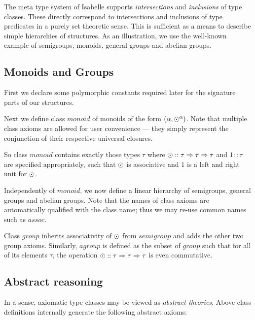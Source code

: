 


The meta type system of Isabelle supports \emph{intersections} and
\emph{inclusions} of type classes. These directly correspond to intersections
and inclusions of type predicates in a purely set theoretic sense. This is
sufficient as a means to describe simple hierarchies of structures.  As an
illustration, we use the well-known example of semigroups, monoids, general
groups and abelian groups.


\subsection{Monoids and Groups}

First we declare some polymorphic constants required later for the signature
parts of our structures.


Next we define class $monoid$ of monoids of the form $(\alpha,
{\odot}^\alpha)$.  Note that multiple class axioms are allowed for user
convenience --- they simply represent the conjunction of their respective
universal closures.


So class $monoid$ contains exactly those types $\tau$ where $\odot :: \tau
\Rightarrow \tau \Rightarrow \tau$ and $1 :: \tau$ are specified appropriately, such that
$\odot$ is associative and $1$ is a left and right unit for $\odot$.


Independently of $monoid$, we now define a linear hierarchy of semigroups,
general groups and abelian groups.  Note that the names of class axioms are
automatically qualified with the class name; thus we may re-use common names
such as $assoc$.


Class $group$ inherits associativity of $\odot$ from $semigroup$ and adds the
other two group axioms. Similarly, $agroup$ is defined as the subset of
$group$ such that for all of its elements $\tau$, the operation $\odot ::
\tau \Rightarrow \tau \Rightarrow \tau$ is even commutative.


\subsection{Abstract reasoning}

In a sense, axiomatic type classes may be viewed as \emph{abstract theories}.
Above class definitions internally generate the following abstract axioms:


